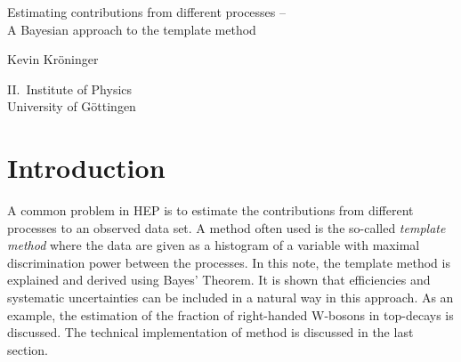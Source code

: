 \documentclass[11pt, a4paper]{article}
\begin{document}

\begin{titlepage}

\begin{center}

\vspace{1.5cm}

{\Large Estimating contributions from different processes --} \\
\vspace{0.2cm}
{\Large A Bayesian approach to the template method}

\vspace{1.0cm}

{\Large Kevin Kr{\"o}ninger} 

\vspace{1.0cm}

{\Large II.~Institute of Physics} \\ 
\vspace{0.2cm}
{\Large University of G\"ottingen}

\end{center}

\vspace{1.0cm}

\begin{abstract}
In this note, the template method is reviewed and derived using Bayes'
Theorem. As an example, the estimation of the fraction of right-handed
W-bosons in top-decays is discussed. 
\end{abstract}

\end{titlepage}


\section{Introduction}
\label{section:introduction}

A common problem in HEP is to estimate the contributions from
different processes to an observed data set. A method often used is
the so-called {\it template method} where the data are given as a
histogram of a variable with maximal discrimination power between the
processes. In this note, the template method is explained and derived
using Bayes' Theorem. It is shown that efficiencies and systematic
uncertainties can be included in a natural way in this approach. As an
example, the estimation of the fraction of right-handed W-bosons in
top-decays is discussed. The technical implementation of method is
discussed in the last section.
\end{document}
